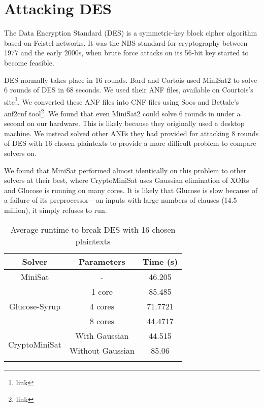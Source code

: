 \section{Attacking DES}
The Data Encryption Standard (DES) is a symmetric-key block cipher algorithm based on Feistel networks. It was the NBS standard for cryptography between 1977 and the early 2000s, when brute force attacks on its 56-bit key started to become feasible.\cite{find appropriate citation}

DES normally takes place in 16 rounds. Bard and Cortois\cite{citation} used MiniSat2 to solve 6 rounds of DES in 68 seconds. We used their ANF files, available on Courtois's site\footnote{link}. We converted these ANF files into CNF files using Soos and Bettale's anf2cnf tool\footnote{link}. We found that even MiniSat2 could solve 6 rounds in under a second on our hardware. This is likely because they originally used a desktop machine. We instead solved other ANFs they had provided for attacking 8 rounds of DES with 16 chosen plaintexts to provide a more difficult problem to compare solvers on.

We found that MiniSat performed almost identically on this problem to other solvers at their best, where CryptoMiniSat uses Gaussian elimination of XORs and Glucose is running on many cores. It is likely that Glucose is slow because of a failure of its preprocessor - on inputs with large numbers of clauses (14.5 million), it simply refuses to run. 

\begin{table}[!htbp]
	\centering
	\begin{tabular}{|c|c|c|}
		\hline
		\textbf{Solver} & \textbf{Parameters} & \textbf{Time (s)} \\
		\hline
		MiniSat & - & 46.205 \\
		\hline
		\multirow{3}{*}{Glucose-Syrup} & 1 core & 85.485 \\ \cline{2-3}
		& 4 cores & 71.7721 \\ \cline{2-3}
		& 8 cores & 44.4717 \\
		\hline
		
		\multirow{3}{*}{CryptoMiniSat} & With Gaussian & 44.515 \\ \cline{2-3} 
		& Without Gaussian & 85.06 \\ \cline{2-3} 
		\hline
	\end{tabular}
	
	\caption{Average runtime to break DES with 16 chosen plaintexts}
	\label{table:des:runtime}
\end{table}